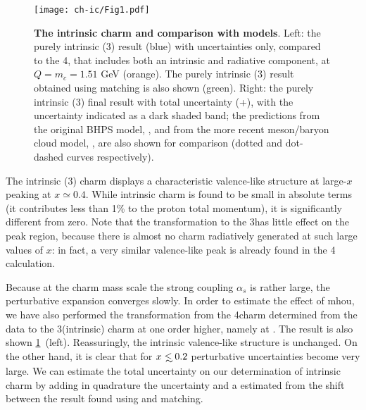 \begin{figure}[h]
  \centering
  \texttt{[image: ch-ic/Fig1.pdf]}
  \caption{\small
    \textbf{ The intrinsic charm \pdf and comparison with models}.
%
    Left: the purely intrinsic (3\fns) result (blue) with \pdf uncertainties
    only, compared to the 4\fns \pdf, that includes both an intrinsic and
    radiative component, at $Q=m_c=1.51$ GeV (orange).
    The purely intrinsic (3\fns) result obtained using \nnnlo matching is
    also shown (green).
    Right: the purely intrinsic (3\fns) final result with total uncertainty
    (\pdf+\mhou), with the \pdf uncertainty indicated as a dark shaded band; the
    predictions from the original BHPS model, \cite{Brodsky:1980pb}, and from
    the more recent meson/baryon cloud model, \cite{Hobbs:2013bia}, are also
    shown for comparison (dotted and dot-dashed curves respectively).
  }
  \label{fig:ic/charm_content_3fns} 
\end{figure}

The intrinsic (3\fns) charm \pdf displays a characteristic valence-like
structure at large-$x$ peaking at $x\simeq 0.4$.
%
While intrinsic charm is found to be small in absolute terms (it contributes
less than 1\% to the proton  total momentum), it is significantly different
from zero.
%
Note that the transformation to the 3\fns has little effect on the peak region,
because there is almost no charm radiatively generated at such large values of
$x$: in fact, a very similar valence-like peak is already found in the 4\fns
calculation.

Because at the charm mass scale the strong coupling $\alpha_s$ is rather large,
the perturbative expansion converges slowly.
%
In order to estimate the effect of \acrfull{mhou}, we have also performed the
transformation from the 4\fns \nnlo charm \pdf determined from the data to the
3\fns (intrinsic) charm \pdf at one order higher, namely at \nnnlo. 
%
The result is also shown \cref{fig:ic/charm_content_3fns}~(left).
Reassuringly, the intrinsic valence-like structure is unchanged.
%
On the other hand, it is clear that for $x\lsim 0.2$ perturbative uncertainties
become very large.
%
We can estimate  the total uncertainty on our determination of intrinsic charm
by adding in quadrature the \pdf uncertainty and a \mhou estimated from the
shift between the result found using \nnlo and \nnnlo matching.


